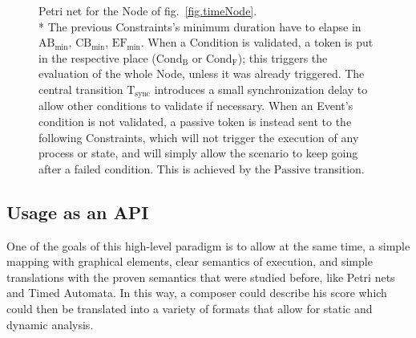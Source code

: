 \documentclass{article}
\begin{document}
\begin{figure}
{
}
	\caption{Petri net for the Node of fig.~\ref{fig.timeNode}.\\*
	The previous Constraints's minimum duration have to elapse in $\mathrm{AB_{min}}$, $\mathrm{CB_{min}}$, $\mathrm{EF_{min}}$. When a Condition is validated, a token is put in the respective place ($\mathrm{Cond_B}$ or $\mathrm{Cond_F}$); this triggers the evaluation of the whole Node, unless it was already triggered. The central transition $\mathrm{T_{sync}}$ introduces a small synchronization delay to allow other conditions to validate if necessary. When an Event's condition is not validated, a passive token is instead sent to the following Constraints, which will not trigger the execution of any process or state, and will simply allow the scenario to keep going after a failed condition.
	This is achieved by the $\mathrm{Passive}$ transition.}
	\label{fig.petri}
	\end{figure}
	
	\subsection{Usage as an API}\label{section.api}
	One of the goals of this high-level paradigm is to allow at the same time, a simple mapping with graphical elements, clear semantics of execution, and simple translations with the proven semantics that were studied before, like Petri nets and Timed Automata. In this way, a composer could describe his score which could then be translated into a variety of formats that allow for static and dynamic analysis.
	
\end{document}
